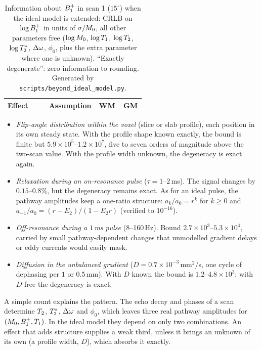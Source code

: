 \begin{table}[!htbp]
\centering
\caption{Information about $B_1^{+}$ in scan 1 ($15^\circ$) when the ideal model is extended: CRLB on
$\log B_1^{+}$ in units of $\sigma/M_0$, all other parameters free ($\log M_0$, $\log T_1$, $\log T_2$, $\log T_2^{*}$, $\Delta\omega$,
$\phi_0$, plus the extra parameter where one is unknown). ``Exactly degenerate'': zero
information to rounding. Generated by \texttt{scripts/beyond\_ideal\_model.py}.}
\label{tab:beyond}
\small\setlength{\tabcolsep}{4pt}
\begin{tabular}{p{0.30\linewidth}p{0.24\linewidth}cc}
\toprule
Effect & Assumption & WM & GM\\
\midrule

\bottomrule
\end{tabular}
\end{table}

\begin{itemize}
\item \emph{Flip-angle distribution within the voxel} (slice or slab profile), each position in
  its own steady state. With the profile shape known exactly, the bound is finite but
  $5.9\times10^5$--$1.2\times10^7$, five to seven orders of magnitude above the two-scan value. With
  the profile width unknown, the degeneracy is exact again.
\item \emph{Relaxation during an on-resonance pulse} ($\tau=1$--$2$\,ms). The signal changes by
  $0.15$--$0.8\%$, but the degeneracy remains exact. As for an ideal pulse, the pathway amplitudes
  keep a one-ratio structure: $a_k/a_0=r^k$ for $k\ge0$ and $a_{-1}/a_0=(r-E_2)/(1-E_2r)$ (verified to
  $10^{-16}$).
\item \emph{Off-resonance during a $1$\,ms pulse} (8--160\,Hz). Bound $2.7\times10^3$--$5.3\times10^4$, carried by
  small pathway-dependent changes that unmodelled gradient delays or eddy currents would
  easily mask.
\item \emph{Diffusion in the unbalanced gradient} ($D=0.7\times10^{-3}$\,mm$^2$/s, one cycle of dephasing per
  $1$ or $0.5$\,mm). With $D$ known the bound is $1.2$--$4.8\times10^3$; with $D$ free the degeneracy is
  exact.
\end{itemize}

A simple count explains the pattern. The echo decay and phases of a scan determine $T_2$, $T_2^{*}$,
$\Delta\omega$ and $\phi_0$, which leaves three real pathway amplitudes for $(M_0,B_1^{+},T_1)$. In the ideal model
they depend on only two combinations. An effect that adds structure supplies a weak third,
unless it brings an unknown of its own (a profile width, $D$), which absorbs it exactly.

